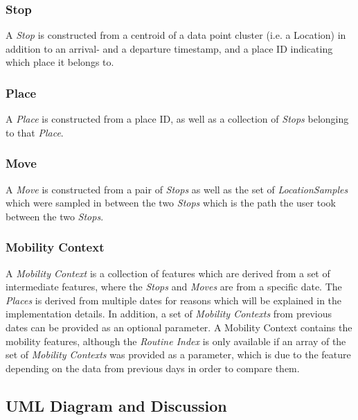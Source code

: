 \subsubsection*{Stop}
A \textit{Stop} is constructed from a centroid of a data point cluster (i.e. a Location) in addition to an arrival- and a departure timestamp, and a place ID indicating which place it belongs to.

\subsubsection*{Place}
A \textit{Place} is constructed from a place ID, as well as a collection of \textit{Stops} belonging to that \textit{Place}. 

\subsubsection*{Move}
A \textit{Move} is constructed from a pair of \textit{Stops} as well as the set of \textit{LocationSamples} which were sampled in between the two \textit{Stops} which is the path the user took between the two \textit{Stops}.

\subsubsection*{Mobility Context}
A \textit{Mobility Context} is a collection of features which are derived from a set of intermediate features, where the \textit{Stops} and \textit{Moves} are from a specific date. The \textit{Places} is derived from multiple dates for reasons which will be explained in the implementation details. In addition, a set of \textit{Mobility Contexts} from previous dates can be provided as an optional parameter. A Mobility Context contains the mobility features, although the \textit{Routine Index} is only available if an array of the set of \textit{Mobility Contexts} was provided as a parameter, which is due to the feature depending on the data from previous days in order to compare them.

\subsection{UML Diagram and Discussion}

